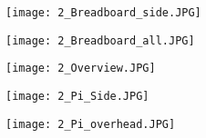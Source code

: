 \documentclass{article}
\begin{document}
\begin{figure}
\texttt{[image: 2\_Breadboard\_side.JPG]}
\end{figure}

\begin{figure}
\texttt{[image: 2\_Breadboard\_all.JPG]}
\end{figure}

\begin{figure}
\texttt{[image: 2\_Overview.JPG]}
\end{figure}

\begin{figure}
\texttt{[image: 2\_Pi\_Side.JPG]}
\end{figure}

\begin{figure}
\texttt{[image: 2\_Pi\_overhead.JPG]}
\end{figure}
\end{document}

